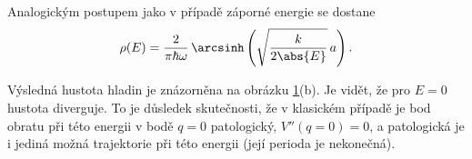 \begin{solution}
\begin{enumerate}
			Analogickým postupem jako v případě záporné energie se dostane
			\begin{equation*}
				\rho(E)
					=\frac{2}{\pi\hbar\omega}\,\arcsinh\left(\sqrt{\frac{k}{2\abs{E}}}\,a\right).
			\end{equation*}				
		\end{enumerate}
		
		\begin{figure}[!htbp]
			\begin{subfigure}{0.45\linewidth}
				\centering{}
			\end{subfigure}
			\hfill
			\begin{subfigure}{0.45\linewidth}
				\centering{}
			\end{subfigure}
			\label{fig:InverseHarmonicOscillator}
		\end{figure}
		
		Výsledná hustota hladin je znázorněna na obrázku \ref{fig:InverseHarmonicOscillator}(b).
		Je vidět, že pro $E=0$ hustota diverguje.
		To je důsledek skutečnosti, že v klasickém případě je bod obratu při této energii v bodě $q=0$
		patologický, $V''(q=0)=0$, a patologická je i jediná možná trajektorie při této energii (její perioda je nekonečná).
    \end{solution}
